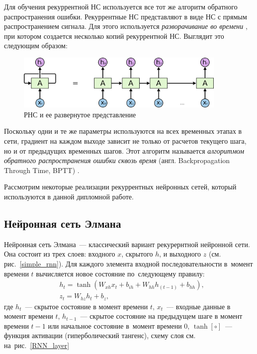 \clearpage
Для обучения рекуррентной НС используется все тот же алгоритм обратного распространения ошибки. 
Рекуррентные НС представляют в виде НС с прямым распространением сигнала. Для этого используется 
\textit{разворачивание во времени} \cite{rnn_backprop}, при котором создается несколько копий рекуррентной НС. 
Выглядит это следующим образом:
\begin{figure}[!h]
	\centering
	\includegraphics[width=0.9\textwidth]{pics/unpack}
	\caption{РНС и ее развернутое представление}
	\label{unpack}
\end{figure}

Поскольку одни и те же параметры используются на всех временных этапах в сети, градиент на каждом выходе зависит не только от расчетов текущего шага, но и от предыдущих временных шагов.
Этот алгоритм называется \textit{алгоритмом обратного распространения ошибки сквозь время} 
(англ. Backpropagation Through Time, BPTT) \cite{BPTT}.

Рассмотрим некоторые реализации рекуррентных нейронных сетей, который используются в данной 
дипломной работе.

\subsection{Нейронная сеть Элмана}\label{elman}

Нейронная сеть Элмана~--- классический вариант рекурернтной нейронной сети. Она состоит из трех слоев: входного $ x $,
скрытого $ h $, и выходного $ z $ (см. рис.~\ref{simple_rnn}).
Для каждого элемента входной последовательности в~момент времени $ t $ 
вычисляется новое состояние по~следующему правилу:
\begin{align*}\label{h_t}
		&h_t = \tanh(W_{xh} x_t + b_{ih} + W_{hh} h_{(t-1)} + b_{hh}),\\
		&z_t = W_{hz}h_t + b_z,
\end{align*}
где $ h_t $~--- скрытое состояние в момент времени $ t $, $ x_t $~--- входные данные в момент 
времени $ t $, $ h_{t-1} $~--- скрытое состояние на предыдущем шаге в момент времени $ t {-} 1$ или 
начальное состояние в~момент времени 0, $ \tanh\left[ \circ \right] $~--- функция активации (гиперболический тангенс), схему слоя см. на~рис.~\ref{RNN_layer}

